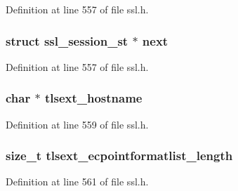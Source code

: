 Definition at line 557 of file ssl.\+h.

\subsubsection[{\texorpdfstring{next}{next}}]{\setlength{\rightskip}{0pt plus 5cm}struct {\bf ssl\+\_\+session\+\_\+st} $\ast$ next}\hypertarget{structssl__session__st_ac3e484e9ddf92b4774ff132baecff4d4}{}\label{structssl__session__st_ac3e484e9ddf92b4774ff132baecff4d4}


Definition at line 557 of file ssl.\+h.

\subsubsection[{\texorpdfstring{tlsext\+\_\+hostname}{tlsext_hostname}}]{\setlength{\rightskip}{0pt plus 5cm}char $\ast$ tlsext\+\_\+hostname}\hypertarget{structssl__session__st_a322c71ead6960d65c1bc64bd96e1a78c}{}\label{structssl__session__st_a322c71ead6960d65c1bc64bd96e1a78c}


Definition at line 559 of file ssl.\+h.

\subsubsection[{\texorpdfstring{tlsext\+\_\+ecpointformatlist\+\_\+length}{tlsext_ecpointformatlist_length}}]{\setlength{\rightskip}{0pt plus 5cm}size\+\_\+t tlsext\+\_\+ecpointformatlist\+\_\+length}\hypertarget{structssl__session__st_ae7ba2dfb840d8ff09aea0b9d2ce00a9f}{}\label{structssl__session__st_ae7ba2dfb840d8ff09aea0b9d2ce00a9f}


Definition at line 561 of file ssl.\+h.

